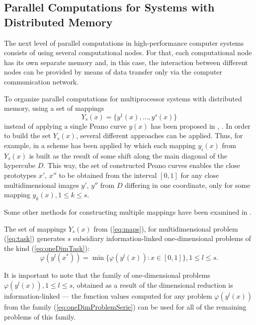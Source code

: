 \documentclass{gOMS2e}
\theoremstyle{plain}%
\theoremstyle{definition}
\theoremstyle{remark}
\begin{document}
\subsection{Parallel Computations for Systems with Distributed Memory}
\label{subsec:distribpar}
The next level of parallel computations in high-performance computer systems consists of
using several computational nodes. For that, each computational node has its own separate
memory and, in this case, the interaction between different nodes can be provided by
means of data transfer only via the computer communication network.
\par
To organize parallel computations for multiprocessor systems with distributed memory, using a set of mappings
\begin{equation}
  \label{eq:maps}
Y_s(x)=\{y^1(x),\dots,y^s(x)\}
\end{equation}
instead of applying a single Peano curve \(y(x)\) has been proposed in \cite{strongin1992}, \cite{strSergGO}.
In order to build the set \(Y_s(x)\), several different approaches can be applied.
Thus, for example, in \cite{strongin1992} a scheme has been applied by which each
mapping \(y_i(x)\) from \(Y_s(x)\) is built as the result of some shift along the main
diagonal of the hypercube \(D\). This way, the set of constructed Peano curves enables the
close prototypes \(x'\), \(x''\)  to be obtained from the interval \([0,1]\) for any close
multidimensional images \(y'\), \(y''\) from \(D\) differing in one coordinate,
only for some mapping \(y_k(x), 1\leqslant k\leqslant s\).
\par
Some other methods for constructing multiple mappings have been examined in \cite{stronginGergelBarkalovParGO}.
\par
The set of mappings \(Y_s(x)\) from (\ref{eq:maps}), for multidimensional problem (\ref{eq:task})
generates \(s\) subsidiary information-linked one-dimensional problems of the kind (\ref{eq:oneDimTask}):
\begin{equation}
  \label{eq:oneDimProblemSerie}
  \varphi(y^l(x^*))=\min\{\varphi(y^l(x)):x\in [0,1]\},1\leqslant l\leqslant s.
\end{equation}
\par
It is important to note that the family of one-dimensional problems \(\varphi(y^l(x)),1\leqslant l\leqslant s\),
obtained as a result of the dimensional reduction is information-linked --- the function
values computed for any problem \(\varphi(y^l(x))\) from the family (\ref{eq:oneDimProblemSerie}) can be used for all
of the remaining problems of this family.
\end{document}
